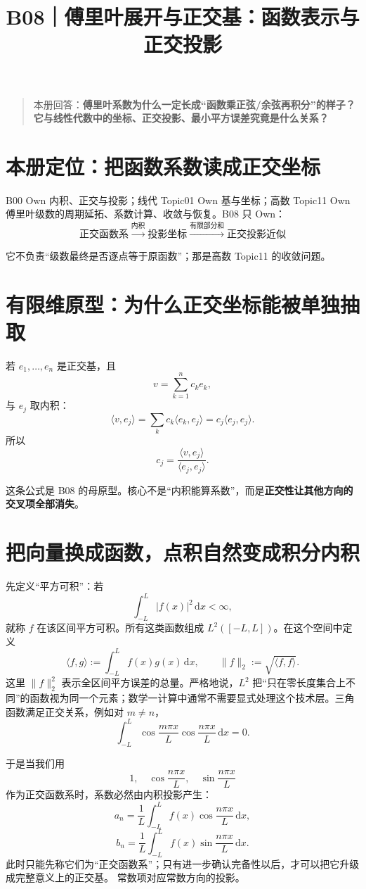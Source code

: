 \documentclass[profile=standard]{ipara-handbook}
\title{B08｜傅里叶展开与正交基：函数表示与正交投影}
\author{}
\date{}
\begin{document}
\maketitle

\begin{quote}
本册回答：\textbf{傅里叶系数为什么一定长成“函数乘正弦/余弦再积分”的样子？它与线性代数中的坐标、正交投影、最小平方误差究竟是什么关系？}
\end{quote}

\section{本册定位：把函数系数读成正交坐标}
B00 Own 内积、正交与投影；线代 Topic01 Own 基与坐标；高数 Topic11 Own 傅里叶级数的周期延拓、系数计算、收敛与恢复。B08 只 Own：
\[
\boxed{
\text{正交函数系}
\xrightarrow{\text{内积}}
\text{投影坐标}
\xrightarrow{\text{有限部分和}}
\text{正交投影近似}
}
\]

它不负责“级数最终是否逐点等于原函数”；那是高数 Topic11 的收敛问题。

\section{有限维原型：为什么正交坐标能被单独抽取}
若 $e_1,\dots,e_n$ 是正交基，且
\[
v=\sum_{k=1}^n c_ke_k,
\]
与 $e_j$ 取内积：
\[
\langle v,e_j\rangle
=\sum_k c_k\langle e_k,e_j\rangle
=c_j\langle e_j,e_j\rangle.
\]
所以
\[
\boxed{c_j=\frac{\langle v,e_j\rangle}{\langle e_j,e_j\rangle}.}
\]

这条公式是 B08 的母原型。核心不是“内积能算系数”，而是\textbf{正交性让其他方向的交叉项全部消失}。

\section{把向量换成函数，点积自然变成积分内积}
先定义“平方可积”：若
\[
\int_{-L}^{L}\lvert f(x)\rvert^2\,\mathrm{d}x<\infty,
\]
就称 $f$ 在该区间平方可积。所有这类函数组成 $L^2([-L,L])$。在这个空间中定义
\[
\langle f,g\rangle:=\int_{-L}^{L}f(x)g(x)\,\mathrm{d}x,
\qquad
\lVert f\rVert_2:=\sqrt{\langle f,f\rangle}.
\]
这里 $\lVert f\rVert_2^2$ 表示全区间平方误差的总量。严格地说，$L^2$ 把“只在零长度集合上不同”的函数视为同一个元素；数学一计算中通常不需要显式处理这个技术层。三角函数满足正交关系，例如对 $m\neq n$，
\[
\int_{-L}^{L}\cos\frac{m\pi x}{L}\cos\frac{n\pi x}{L}\,\mathrm{d}x=0.
\]

于是当我们用
\[
1,\quad \cos\frac{n\pi x}{L},\quad \sin\frac{n\pi x}{L}
\]
作为正交函数系时，系数必然由内积投影产生：
\[
\boxed{
a_n=\frac1L\int_{-L}^{L}f(x)\cos\frac{n\pi x}{L}\,\mathrm{d}x,
}
\]
\[
\boxed{
b_n=\frac1L\int_{-L}^{L}f(x)\sin\frac{n\pi x}{L}\,\mathrm{d}x.
}
\]
此时只能先称它们为“正交函数系”；只有进一步确认完备性以后，才可以把它升级成完整意义上的正交基。
常数项对应常数方向的投影。
\end{document}
